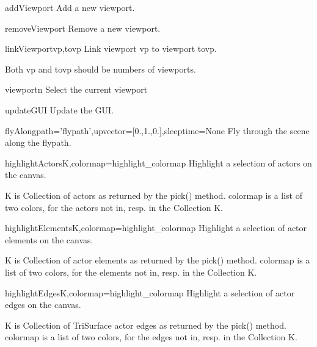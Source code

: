 \begin{funcdesc}{addViewport}{}
Add a new viewport.
\end{funcdesc}

\begin{funcdesc}{removeViewport}{}
Remove a new viewport.
\end{funcdesc}

\begin{funcdesc}{linkViewport}{vp,tovp}
Link viewport vp to viewport tovp.

Both vp and tovp should be numbers of viewports. 

\end{funcdesc}

\begin{funcdesc}{viewport}{n}
Select the current viewport
\end{funcdesc}

\begin{funcdesc}{updateGUI}{}
Update the GUI.
\end{funcdesc}

\begin{funcdesc}{flyAlong}{path='flypath',upvector=[0.,1.,0.],sleeptime=None}
Fly through the scene along the flypath.
\end{funcdesc}

\begin{funcdesc}{highlightActors}{K,colormap=highlight_colormap}
Highlight a selection of actors on the canvas.

K is Collection of actors as returned by the pick() method.
colormap is a list of two colors, for the actors not in, resp. in
the Collection K.

\end{funcdesc}

\begin{funcdesc}{highlightElements}{K,colormap=highlight_colormap}
Highlight a selection of actor elements on the canvas.

K is Collection of actor elements as returned by the pick() method.
colormap is a list of two colors, for the elements not in, resp. in
the Collection K.

\end{funcdesc}

\begin{funcdesc}{highlightEdges}{K,colormap=highlight_colormap}
Highlight a selection of actor edges on the canvas.

K is Collection of TriSurface actor edges as returned by the pick() method.
colormap is a list of two colors, for the edges not in, resp. in
the Collection K.

\end{funcdesc}

